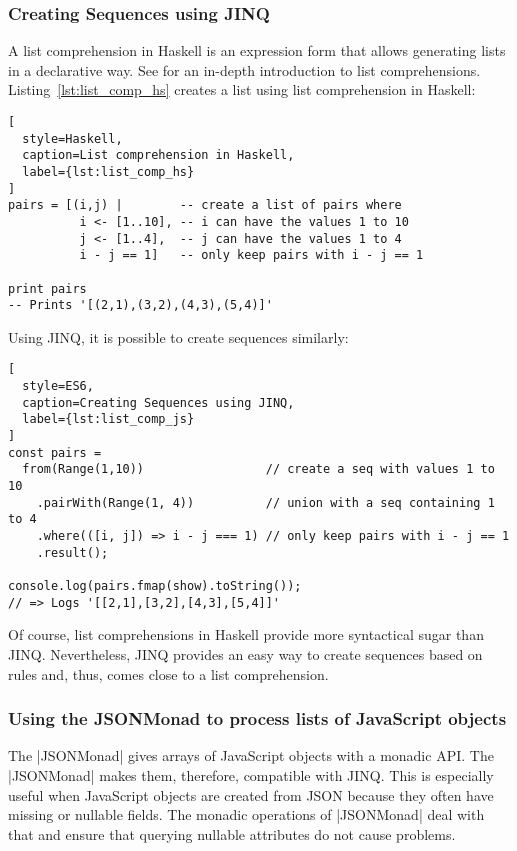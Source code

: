 \subsubsection{Creating Sequences using JINQ} %
\label{subsub:Creating Sequences using JINQ}
A list comprehension in Haskell is an expression form that allows generating
lists in a declarative way. See \cite[Ch. 5]{hutton_pih_2016} for an
in-depth introduction to list comprehensions. \\
Listing~\ref{lst:list_comp_hs} creates a list using list comprehension in
Haskell:

\begin{lstlisting}[
  style=Haskell,
  caption=List comprehension in Haskell,
  label={lst:list_comp_hs}
]
pairs = [(i,j) |        -- create a list of pairs where
          i <- [1..10], -- i can have the values 1 to 10
          j <- [1..4],  -- j can have the values 1 to 4
          i - j == 1]   -- only keep pairs with i - j == 1

print pairs
-- Prints '[(2,1),(3,2),(4,3),(5,4)]'
\end{lstlisting}

Using JINQ, it is possible to create sequences similarly:
\begin{lstlisting}[
  style=ES6,
  caption=Creating Sequences using JINQ,
  label={lst:list_comp_js}
]
const pairs =
  from(Range(1,10))                 // create a seq with values 1 to 10
    .pairWith(Range(1, 4))          // union with a seq containing 1 to 4
    .where(([i, j]) => i - j === 1) // only keep pairs with i - j == 1
    .result();

console.log(pairs.fmap(show).toString());
// => Logs '[[2,1],[3,2],[4,3],[5,4]]'
\end{lstlisting}

Of course, list comprehensions in Haskell provide more syntactical sugar than
JINQ. Nevertheless, JINQ provides an easy way to create sequences based on
rules and, thus, comes close to a list comprehension.

\subsubsection{Using the JSONMonad to process lists of JavaScript objects} %
\label{subsub:Using the JSONMonad to process lists of JavaScript objects}
The |JSONMonad| gives arrays of JavaScript objects with a monadic API. The
|JSONMonad| makes them, therefore, compatible with JINQ. This is especially
useful when JavaScript objects are created from JSON because they often have
missing or nullable fields. The monadic operations of |JSONMonad| deal with
that and ensure that querying nullable attributes do not cause problems.

